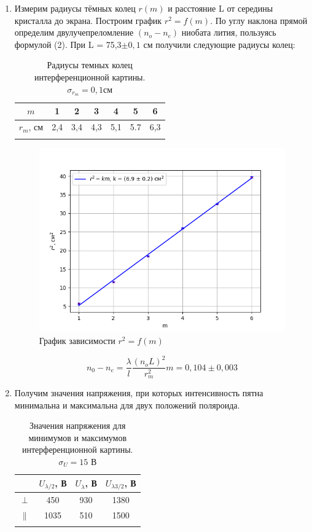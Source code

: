 \documentclass[a4paper, 12pt]{article}%
\begin{document}
	\begin{enumerate}
		
	\item Измерим радиусы тёмных колец $r(m)$ и расстояние L от середины кристалла до экрана. Построим график $r^2 = f(m) $. По углу наклона прямой определим двулучепреломление $(n_o - n_e)$ ниобата лития, пользуясь формулой (2). При L = 75,3$\pm 0,1$ см получили следующие радиусы колец:
	
	\begin{longtable}{|c|c|c|c|c|c|c|}
	\hline
	$m$     & 1   & 2   & 3   & 4   & 5   & 6 \\ \hline
	$r_m$, см & 2,4 & 3,4 & 4,3 & 5,1 & 5.7 & 6,3 \\ \hline
	\caption{Радиусы темных колец интерференционной картины. $\sigma_{r_m} = 0,1\text{см}$}
	\end{longtable}

	 \begin{figure}[h]
		\includegraphics[scale=0.7]{km.png}
		\centering
		\caption{График зависимости $r^2 = f(m)$}
	\end{figure}
	
	$$
	 n_0 - n_e = \dfrac{\lambda}{l} \dfrac{(n_oL)^2}{r_m^2}m = 0,104 \pm 0,003
	$$
	
	\item Получим значения напряжения, при которых интенсивность пятна минимальна и максимальна для двух положений поляроида.
	
	
	\begin{longtable}{|c|c|c|c|}
		\hline
		 & $U_{\lambda/2}$, В & $U_{\lambda}$, В & $U_{\lambda 3/2}$, В \\ \hline
		$\perp$ & 450 & 930 & 1380 \\ \hline
		$\parallel$ & 1035 & 510 & 1500 \\ \hline
		\caption{Значения напряжения для минимумов и максимумов интерференционной картины. $\sigma_U = 15$ В}
	\end{longtable}
	

\end{enumerate}
\end{document}

